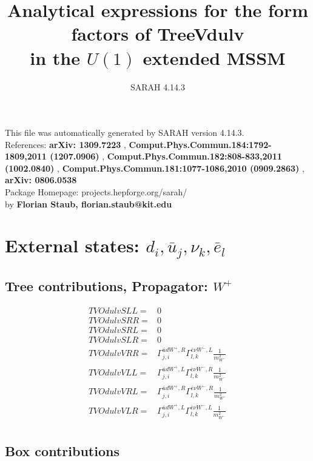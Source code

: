 \documentclass[A4,landscape]{article}
\begin{document}
\title{Analytical expressions for the form factors of TreeVdulv\\ in the $U(1)$ extended MSSM } 
 \author{SARAH 4.14.3} 
 \maketitle 
 \vspace{10cm} 
This file was automatically generated by SARAH version 4.14.3.  \\ 
References: {\bf arXiv: 1309.7223 }, {\bf Comput.Phys.Commun.184:1792-1809,2011 (1207.0906) }, {\bf Comput.Phys.Commun.182:808-833,2011 (1002.0840) }, {\bf Comput.Phys.Commun.181:1077-1086,2010 (0909.2863) }, {\bf arXiv: 0806.0538 } \\ 
Package Homepage: projects.hepforge.org/sarah/ \\ 
by {\bf Florian Staub, florian.staub@kit.edu} 
 \pagebreak 
 \tableofcontents 
 \pagebreak 
\section{External states: ${d_{{i}}, \bar{u}_{{j}}, \nu_{{k}}, \bar{e}_{{l}}}$} 
\subsection{Tree contributions, Propagator: $W^+$} 

\begin{align} 
  TVOdulvSLL= & 0 \\ 
  TVOdulvSRR= & 0 \\ 
  TVOdulvSRL= & 0 \\ 
  TVOdulvSLR= & 0 \\ 
  TVOdulvVRR= & \Gamma^{\bar{u}d W^+,R}_{j, i} \Gamma^{\bar{e}\nu W^- ,L}_{l, k} \frac{1}{m^2_{W^-}} \\ 
  TVOdulvVLL= & \Gamma^{\bar{u}d W^+,L}_{j, i} \Gamma^{\bar{e}\nu W^- ,R}_{l, k} \frac{1}{m^2_{W^-}} \\ 
  TVOdulvVRL= & \Gamma^{\bar{u}d W^+,R}_{j, i} \Gamma^{\bar{e}\nu W^- ,R}_{l, k} \frac{1}{m^2_{W^-}} \\ 
  TVOdulvVLR= & \Gamma^{\bar{u}d W^+,L}_{j, i} \Gamma^{\bar{e}\nu W^- ,L}_{l, k} \frac{1}{m^2_{W^-}} \\ 
\end{align} 
\subsection{Box contributions} 
\end{document}
